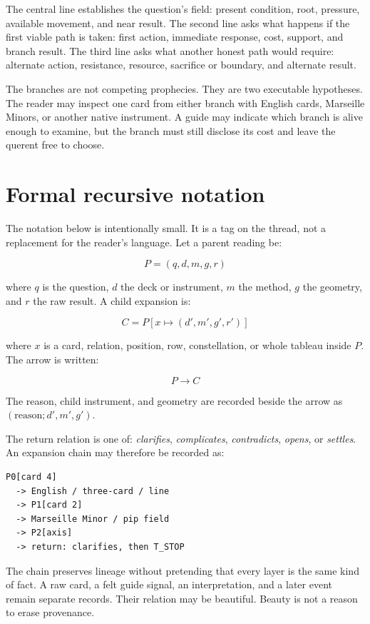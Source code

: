 The central line establishes the question's field: present condition, root,
pressure, available movement, and near result. The second line asks what happens
if the first viable path is taken: first action, immediate response, cost,
support, and branch result. The third line asks what another honest path would
require: alternate action, resistance, resource, sacrifice or boundary, and
alternate result.

The branches are not competing prophecies. They are two executable hypotheses.
The reader may inspect one card from either branch with English cards, Marseille
Minors, or another native instrument. A guide may indicate which branch is alive
enough to examine, but the branch must still disclose its cost and leave the
querent free to choose.

\section{Formal recursive notation}

The notation below is intentionally small. It is a tag on the thread, not a
replacement for the reader's language. Let a parent reading be:

\[
P=(q,d,m,g,r)
\]

where $q$ is the question, $d$ the deck or instrument, $m$ the method, $g$ the
geometry, and $r$ the raw result. A child expansion is:

\[
C=P[x \mapsto (d',m',g',r')]
\]

where $x$ is a card, relation, position, row, constellation, or whole tableau
inside $P$. The arrow is written:

\[
P \longrightarrow C
\]

The reason, child instrument, and geometry are recorded beside the arrow as
$(\mathrm{reason};d',m',g')$.

The return relation is one of: \emph{clarifies}, \emph{complicates},
\emph{contradicts}, \emph{opens}, or \emph{settles}. An expansion chain may
therefore be recorded as:

\begin{verbatim}
P0[card 4]
  -> English / three-card / line
  -> P1[card 2]
  -> Marseille Minor / pip field
  -> P2[axis]
  -> return: clarifies, then T_STOP
\end{verbatim}

The chain preserves lineage without pretending that every layer is the same
kind of fact. A raw card, a felt guide signal, an interpretation, and a later
event remain separate records. Their relation may be beautiful. Beauty is not a
reason to erase provenance.

